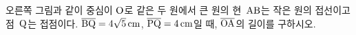\noindent\begin{minipage}[t]{0.58\linewidth}\vspace{0pt}\raggedright 오른쪽 그림과 같이 중심이 $\mathrm{O}$로 같은 두 원에서 큰 원의 현~$\mathrm{AB}$는 작은 원의 접선이고 점~$\mathrm{Q}$는 접점이다. $\overline{\mathrm{BQ}}=4\sqrt{5}\,\mathrm{cm}$, $\overline{\mathrm{PQ}}=4\,\mathrm{cm}$일 때, $\overline{\mathrm{OA}}$의 길이를 구하시오. \end{minipage}\hfill\begin{minipage}[t]{0.4\linewidth}\vspace{0pt}\centering \resizebox{\ifdim\width>\linewidth\linewidth\else\width\fi}{!}{}\end{minipage}\par
